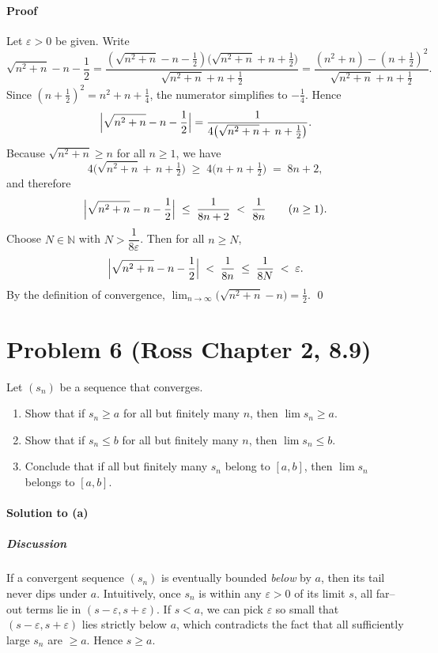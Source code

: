 \documentclass[12pt]{article}
\begin{document}
\paragraph{Proof}
Let $\varepsilon>0$ be given. Write
\[
\sqrt{n^2+n}-n-\frac12
=\frac{(\sqrt{n^2+n}-n-\tfrac12)\bigl(\sqrt{n^2+n}+n+\tfrac12\bigr)}
      {\sqrt{n^2+n}+n+\tfrac12}
=\frac{(n^2+n)-(n+\tfrac12)^2}{\sqrt{n^2+n}+n+\tfrac12}.
\]
Since $(n+\tfrac12)^2=n^2+n+\tfrac14$, the numerator simplifies to
$-\tfrac14$. Hence
\[
\Bigl|\sqrt{n^2+n}-n-\frac12\Bigr|
=\frac{1}{4\bigl(\sqrt{n^2+n}+\,n+\tfrac12\bigr)}.
\]
Because $\sqrt{n^2+n}\ge n$ for all $n\ge 1$, we have
\[
4\bigl(\sqrt{n^2+n}+\,n+\tfrac12\bigr)
\;\ge\;4\bigl(n+n+\tfrac12\bigr)
\;=\;8n+2,
\]
and therefore
\[
\Bigl|\sqrt{n^2+n}-n-\frac12\Bigr|
\;\le\;\frac{1}{8n+2}
\;<\;\frac{1}{8n}\qquad(n\ge1).
\]
Choose $N\in\mathbb{N}$ with $N>\dfrac{1}{8\varepsilon}$.
Then for all $n\ge N$,
\[
\Bigl|\sqrt{n^2+n}-n-\frac12\Bigr|
\;<\;\frac{1}{8n}
\;\le\;\frac{1}{8N}
\;<\;\varepsilon.
\]
By the definition of convergence, $\displaystyle\lim_{n\to\infty}
\bigl(\sqrt{n^2+n}-n\bigr)=\tfrac12$.
\qed
\section*{Problem 6 (Ross Chapter 2, 8.9)}
Let $(s_n)$ be a sequence that converges.

\begin{enumerate}[label=\textbf{(\alph*)}]
  \item Show that if $s_n \ge a$ for all but finitely many $n$, then $\lim s_n \ge a$.
  \item Show that if $s_n \le b$ for all but finitely many $n$, then $\lim s_n \le b$.
  \item Conclude that if all but finitely many $s_n$ belong to $[a,b]$, then $\lim s_n$ belongs to $[a,b]$.
\end{enumerate}

\paragraph{Solution to (a)}
\subparagraph{Discussion}
If a convergent sequence $(s_n)$ is eventually bounded \emph{below} by $a$, then its tail never dips under $a$. 
Intuitively, once $s_n$ is within any $\varepsilon>0$ of its limit $s$, all far–out terms lie in $(s-\varepsilon,s+\varepsilon)$.
If $s<a$, we can pick $\varepsilon$ so small that $(s-\varepsilon,s+\varepsilon)$ lies strictly below $a$, which contradicts
the fact that all sufficiently large $s_n$ are $\ge a$. Hence $s\ge a$.
\end{document}
